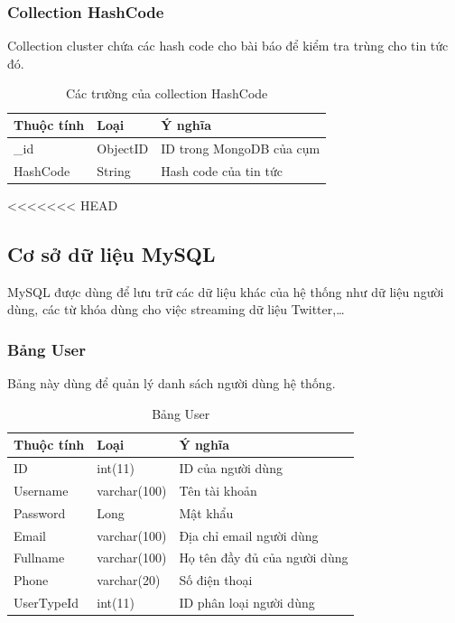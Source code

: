 		\subsubsection{Collection HashCode}
		Collection cluster chứa các hash code cho bài báo để kiểm tra trùng cho tin tức đó.
		\begin{table}[H]
			\setlength\extrarowheight{3pt}
			\begin{tabular}{|l|l|p{9cm}|}
				\hline
				\textbf{Thuộc tính}     & \textbf{Loại} & \textbf{Ý nghĩa} \\\hline
				\_id           & ObjectID       &  ID trong MongoDB của cụm\\\hline
				HashCode      & String           & Hash code của tin tức\\\hline
			\end{tabular}%
			\caption{Các trường của collection HashCode}
			\label{tab:table_3_3}%
		\end{table}%
<<<<<<< HEAD

	\subsection{Cơ sở dữ liệu MySQL}
	MySQL được dùng để lưu trữ các dữ liệu khác của hệ thống như dữ liệu người dùng, các từ khóa dùng cho việc streaming dữ liệu Twitter,…
		\subsubsection{Bảng User}
		Bảng này dùng để quản lý danh sách người dùng hệ thống.
			\begin{table}[H]
				\centering
				\setlength\extrarowheight{3pt}
				\begin{tabular}{|l|l|l|}
					\hline
					\textbf{Thuộc tính} & \textbf{Loại} & \textbf{Ý nghĩa} \\ \hline
					ID & int(11) & ID của người dùng\\\hline
					Username & varchar(100) &  Tên tài khoản\\\hline
					Password & Long &  Mật khẩu\\\hline
					Email & varchar(100) &  Địa chỉ email người dùng\\\hline
					Fullname & varchar(100) &  Họ tên đầy đủ của người dùng\\\hline
					Phone & varchar(20) &  Số điện thoại\\\hline
					UserTypeId & int(11) &  ID phân loại người dùng\\\hline
				\end{tabular}
				\caption{Bảng User}
				\label{tab:usertable}
			\end{table}
